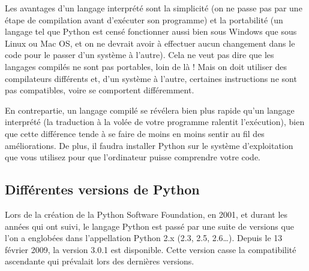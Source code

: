\documentclass[10pt,fleqn]{article} %
\begin{document}
Les avantages d'un langage interprété sont la simplicité (on ne passe pas par une étape de compilation avant d'exécuter son programme) et la portabilité (un langage tel que Python est censé fonctionner aussi bien sous Windows que sous Linux ou Mac OS, et on ne devrait avoir à effectuer aucun changement dans le code pour le passer d'un système à l'autre). Cela ne veut pas dire que les langages compilés ne sont pas portables, loin de là ! Mais on doit utiliser des compilateurs différents et, d'un système à l'autre, certaines instructions ne sont pas compatibles, voire se comportent différemment.

En contrepartie, un langage compilé se révélera bien plus rapide qu'un langage interprété (la traduction à la volée de votre programme ralentit l'exécution), bien que cette différence tende à se faire de moins en moins sentir au fil des améliorations. De plus, il faudra installer Python sur le système d'exploitation que vous utilisez pour que l'ordinateur puisse comprendre votre code.

\subsection{Différentes versions de Python}

Lors de la création de la Python Software Foundation, en 2001, et durant les années qui ont suivi, le langage Python est passé par une suite de versions que l'on a englobées dans l'appellation Python 2.x (2.3, 2.5, 2.6…). Depuis le 13 février 2009, la version 3.0.1 est disponible. Cette version casse la compatibilité ascendante qui prévalait lors des dernières versions.







\begin{thebibliography}{2}
\end{thebibliography}
\end{document}
